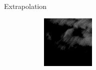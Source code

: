 \documentclass{beamer}
\begin{document}
\begin{frame}{Extrapolation}
\begin{figure}
\begin{subfigure}{.3\textwidth}
\begin{mdframed}[style=blue,nobreak=true,align=center]
	        \end{mdframed}
	    \end{subfigure}
	    \begin{subfigure}{.3\textwidth}
	        \centering
	        \begin{mdframed}[style=blue,nobreak=true,align=center]
	        \includegraphics[width=\linewidth]{fig/extra/2.png}
	        \end{mdframed}
	    \end{subfigure}
	\end{figure}


\end{frame}
\end{document}

